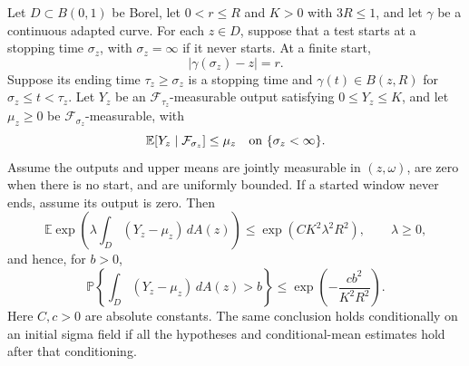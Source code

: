 \begin{lemma}\label{win:concentration}
Let $D\subset B(0,1)$ be Borel, let $0<r\le R$ and $K>0$ with $3R\le1$, and let
$\gamma$ be a continuous adapted curve.  For each $z\in D$, suppose that
a test starts at a stopping time $\sigma_z$, with $\sigma_z=\infty$ if it
never starts.  At a finite start,
\[
 |\gamma(\sigma_z)-z|=r.
\]
Suppose its ending time $\tau_z\ge\sigma_z$ is a stopping time and
$\gamma(t)\in B(z,R)$ for $\sigma_z\le t<\tau_z$.
Let $Y_z$ be an $\mathcal F_{\tau_z}$-measurable output satisfying
$0\le Y_z\le K$, and let $\mu_z\ge0$ be $\mathcal F_{\sigma_z}$-measurable,
with
\[
 \mathbb E[Y_z\mid\mathcal F_{\sigma_z}]\le\mu_z
 \quad\hbox{on }\{\sigma_z<\infty\}.
\]
Assume the outputs and upper means are jointly measurable in $(z,\omega)$,
are zero when there is no start, and are uniformly bounded.  If a started
window never ends, assume its output is zero.  Then
\begin{equation}
 \mathbb E\exp\left(\lambda\int_D(Y_z-\mu_z)\,dA(z)\right)
       \le \exp(CK^2\lambda^2 R^2),\qquad \lambda\ge0,
 \label{win:mgf}
\end{equation}
and hence, for $b>0$,
\begin{equation}
 \mathbb P\left\{\int_D(Y_z-\mu_z)\,dA(z)>b\right\}
       \le \exp\left(-\frac{c b^2}{K^2R^2}\right).
 \label{win:tail}
\end{equation}
Here $C,c>0$ are absolute constants.  The same conclusion holds
conditionally on an initial sigma field if all the hypotheses and
conditional-mean estimates hold after that conditioning.
\end{lemma}

